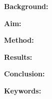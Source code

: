 \textbf{Background:}

\textbf{Aim:}

\textbf{Method:}

\textbf{Results:}

\textbf{Conclusion:}

\textbf{Keywords:}
\textit{}